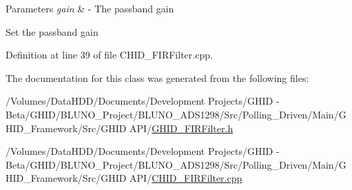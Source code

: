 \begin{DoxyParams}{\-Parameters}
{\em gain} & -\/ \-The passband gain \\
\hline
\end{DoxyParams}
\-Set the passband gain 

\-Definition at line 39 of file \-C\-H\-I\-D\-\_\-\-F\-I\-R\-Filter.\-cpp.



\-The documentation for this class was generated from the following files\-:\begin{DoxyCompactItemize}
\item 
/\-Volumes/\-Data\-H\-D\-D/\-Documents/\-Development Projects/\-G\-H\-I\-D -\/ Beta/\-G\-H\-I\-D/\-B\-L\-U\-N\-O\-\_\-\-Project/\-B\-L\-U\-N\-O\-\_\-\-A\-D\-S1298/\-Src/\-Polling\-\_\-\-Driven/\-Main/\-G\-H\-I\-D\-\_\-\-Framework/\-Src/\-G\-H\-I\-D A\-P\-I/\hyperlink{_g_h_i_d___f_i_r_filter_8h}{\-G\-H\-I\-D\-\_\-\-F\-I\-R\-Filter.\-h}\item 
/\-Volumes/\-Data\-H\-D\-D/\-Documents/\-Development Projects/\-G\-H\-I\-D -\/ Beta/\-G\-H\-I\-D/\-B\-L\-U\-N\-O\-\_\-\-Project/\-B\-L\-U\-N\-O\-\_\-\-A\-D\-S1298/\-Src/\-Polling\-\_\-\-Driven/\-Main/\-G\-H\-I\-D\-\_\-\-Framework/\-Src/\-G\-H\-I\-D A\-P\-I/\hyperlink{_c_h_i_d___f_i_r_filter_8cpp}{\-C\-H\-I\-D\-\_\-\-F\-I\-R\-Filter.\-cpp}\end{DoxyCompactItemize}
